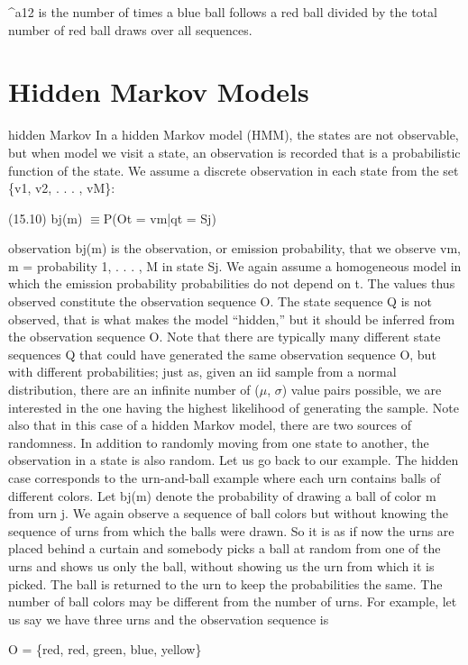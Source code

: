 \textasciicircum{}a12 is the number of times a blue ball follows a red ball divided by the total number of red ball draws over all sequences.

\section{Hidden Markov Models}

hidden Markov In a hidden Markov model (HMM), the states are not observable, but when model we visit a state, an observation is recorded that is a probabilistic function of the state. We assume a discrete observation in each state from the set \{v1, v2, . . . , vM\}:

(15.10) bj(m) $\equiv$P(Ot = vm|qt = Sj)

observation bj(m) is the observation, or emission probability, that we observe vm, m = probability 1, . . . , M in state Sj. We again assume a homogeneous model in which the emission probability probabilities do not depend on t. The values thus observed constitute the observation sequence O. The state sequence Q is not observed, that is what makes the model “hidden,” but it should be inferred from the observation sequence O. Note that there are typically many different state sequences Q that could have generated the same observation sequence O, but with different probabilities; just as, given an iid sample from a normal distribution, there are an infinite number of ($\mu$, $\sigma$) value pairs possible, we are interested in the one having the highest likelihood of generating the sample. Note also that in this case of a hidden Markov model, there are two sources of randomness. In addition to randomly moving from one state to another, the observation in a state is also random. Let us go back to our example. The hidden case corresponds to the urn-and-ball example where each urn contains balls of different colors. Let bj(m) denote the probability of drawing a ball of color m from urn j. We again observe a sequence of ball colors but without knowing the sequence of urns from which the balls were drawn. So it is as if now the urns are placed behind a curtain and somebody picks a ball at random from one of the urns and shows us only the ball, without showing us the urn from which it is picked. The ball is returned to the urn to keep the probabilities the same. The number of ball colors may be different from the number of urns. For example, let us say we have three urns and the observation sequence is

O = \{red, red, green, blue, yellow\}

